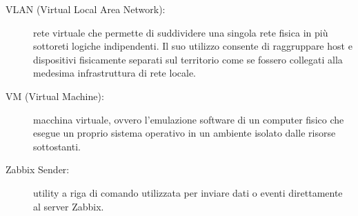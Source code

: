 \documentclass[12pt, a4paper, oneside]{report}
\begin{document}
\begin{description}
    \item[VLAN (Virtual Local Area Network):] rete virtuale che permette di suddividere una singola rete fisica in più sottoreti logiche indipendenti. Il suo utilizzo consente di raggruppare host e dispositivi fisicamente separati sul territorio come se fossero collegati alla medesima infrastruttura di rete locale.
    \item[VM (Virtual Machine):] macchina virtuale, ovvero l'emulazione software di un computer fisico che esegue un proprio sistema operativo in un ambiente isolato dalle risorse sottostanti.
    \item[Zabbix Sender:] utility a riga di comando utilizzata per inviare dati o eventi direttamente al server Zabbix.

\end{description}

\end{document}
